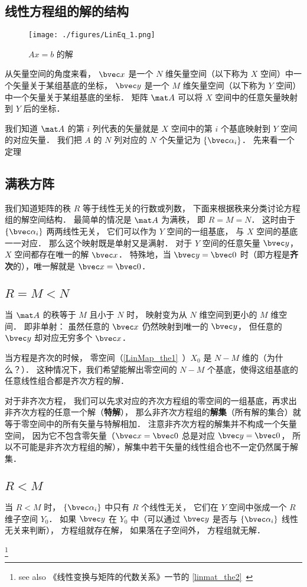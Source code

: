\subsection{线性方程组的解的结构}
\begin{figure}[ht]
\centering
\texttt{[image: ./figures/LinEq\_1.png]}
\caption{$Ax=b$ 的解} \label{LinEq_fig1}
\end{figure}

从矢量空间的角度来看， $\bvec x$ 是一个 $N$ 维矢量空间（以下称为 $X$ 空间）中一个矢量关于某组基底的坐标， $\bvec y$ 是一个 $M$ 维矢量空间（以下称为 $Y$ 空间）中一个矢量关于某组基底的坐标． 矩阵 $\mat A$ 可以将 $X$ 空间中的任意矢量映射到 $Y$ 后的坐标．

我们知道 $\mat A$ 的第 $i$ 列代表的矢量就是 $X$ 空间中的第 $i$ 个基底映射到 $Y$ 空间的对应矢量． 我们把 $A$ 的 $N$ 列对应的 $N$ 个矢量记为 $\{\bvec \alpha_i\}$． 先来看一个定理

\subsection{满秩方阵}
我们知道矩阵的秩 $R$ 等于线性无关的行数或列数， 下面来根据秩来分类讨论方程组的解空间结构． 最简单的情况是 $\mat A$ 为满秩， 即 $R = M = N$． 这时由于 $\{\bvec \alpha_i\}$ 两两线性无关， 它们可以作为 $Y$ 空间的一组基底， 与 $X$ 空间的基底一一对应． 那么这个映射既是单射又是满射．%
对于 $Y$ 空间的任意矢量 $\bvec y$， $X$ 空间都存在唯一的解 $\bvec x$． 特殊地，当 $\bvec y = \bvec 0$ 时（即方程是\textbf{齐次}的），唯一解就是 $\bvec x = \bvec 0$．

\subsection{$R = M < N$}\label{LinEq_sub1}

当 $\mat A$ 的秩等于 $M$ 且小于 $N$ 时， 映射变为从 $N$ 维空间到更小的 $M$ 维空间． 即非单射： 虽然任意的 $\bvec x$ 仍然映射到唯一的 $\bvec y$， 但任意的 $\bvec y$ 却对应无穷多个 $\bvec x$． 


当方程是齐次的时候， 零空间（\autoref{LinMap_the1}~）$X_0$ 是 $N- M$ 维的（为什么？）． 这种情况下，我们希望能解出零空间的 $N - M$ 个基底，使得这组基底的任意线性组合都是齐次方程的解．

对于非齐次方程， 我们可以先求对应的齐次方程组的零空间的一组基底，再求出非齐次方程的任意一个解（\textbf{特解}）， 那么非齐次方程组的\textbf{解集}（所有解的集合）就等于零空间中的所有矢量与特解相加． 注意非齐次方程的解集并不构成一个矢量空间， 因为它不包含零矢量（$\bvec x = \bvec 0$ 总是对应 $\bvec y = \bvec 0$， 所以不可能是非齐次方程组的解），解集中若干矢量的线性组合也不一定仍然属于解集．

\subsection{$R < M$}
当 $R < M$ 时， $\{\bvec \alpha_i\}$ 中只有 $R$ 个线性无关， 它们在 $Y$ 空间中张成一个 $R$ 维子空间 $Y_0$． 如果 $\bvec y$ 在 $Y_0$ 中（可以通过 $\bvec y$ 是否与 $\{\bvec \alpha_i\}$ 线性无关来判断）， 方程组就存在解， 如果落在子空间外， 方程组就无解．

\footnote{see also 《线性变换与矩阵的代数关系》一节的 \autoref{linmat_the2}~}
